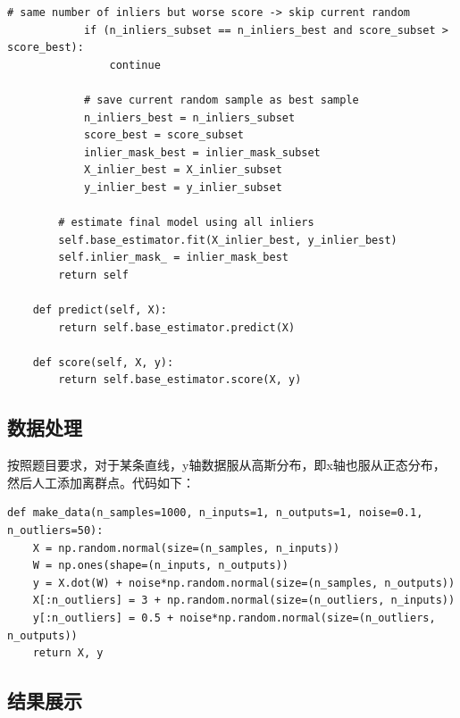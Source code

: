 \documentclass{article}
\begin{document}
\begin{lstlisting}[title={RANSAC代码}]
            # same number of inliers but worse score -> skip current random
            if (n_inliers_subset == n_inliers_best and score_subset > score_best):
                continue

            # save current random sample as best sample
            n_inliers_best = n_inliers_subset
            score_best = score_subset
            inlier_mask_best = inlier_mask_subset
            X_inlier_best = X_inlier_subset
            y_inlier_best = y_inlier_subset

        # estimate final model using all inliers
        self.base_estimator.fit(X_inlier_best, y_inlier_best)
        self.inlier_mask_ = inlier_mask_best
        return self

    def predict(self, X):
        return self.base_estimator.predict(X)

    def score(self, X, y):
        return self.base_estimator.score(X, y)
\end{lstlisting}

\subsection{数据处理}

按照题目要求，对于某条直线，y轴数据服从高斯分布，即x轴也服从正态分布，然后人工添加离群点。代码如下：

\begin{lstlisting}[title={数据处理}]
def make_data(n_samples=1000, n_inputs=1, n_outputs=1, noise=0.1, n_outliers=50):
    X = np.random.normal(size=(n_samples, n_inputs))
    W = np.ones(shape=(n_inputs, n_outputs))
    y = X.dot(W) + noise*np.random.normal(size=(n_samples, n_outputs))
    X[:n_outliers] = 3 + np.random.normal(size=(n_outliers, n_inputs))
    y[:n_outliers] = 0.5 + noise*np.random.normal(size=(n_outliers, n_outputs))
    return X, y
\end{lstlisting}

\subsection{结果展示}
\end{document}
